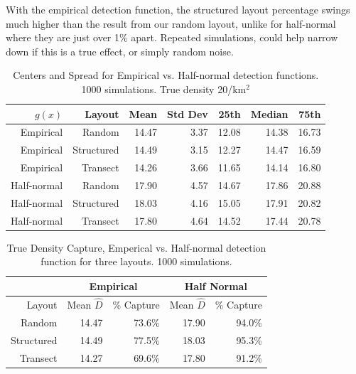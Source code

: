 \documentclass[12pt]{article}
\begin{document}
With the empirical detection function, the structured layout percentage swings much higher than the result from our random layout, unlike for half-normal where they are just over 1\% apart. Repeated simulations, could help narrow down if this is a true effect, or simply random noise.
\begin{table}[h]

	\begin{tabular}{ r r |r r| r r r}
		$g(x)$      & Layout     & Mean  & Std Dev & 25th  & Median & 75th  \\ \hline\hline
		Empirical   & Random     & 14.47 & 3.37    & 12.08 & 14.38  & 16.73 \\
		Empirical   & Structured & 14.49 & 3.15    & 12.27 & 14.47  & 16.59 \\
		Empirical   & Transect   & 14.26 & 3.66    & 11.65 & 14.14  & 16.80 \\ \hline
		Half-normal & Random     & 17.90 & 4.57    & 14.67 & 17.86  & 20.88 \\
		Half-normal & Structured & 18.03 & 4.16    & 15.05 & 17.91  & 20.82 \\
		Half-normal & Transect   & 17.80 & 4.64    & 14.52 & 17.44  & 20.78
	\end{tabular}
	\caption{Centers and Spread for Empirical vs. Half-normal detection functions. 1000 simulations. True density 20/km$^2$}
	\label{table:sim1}
\end{table}
\begin{table}[h]

	\begin{tabular}{ r| r r| r r|}
		           & \multicolumn{2}{|c|}{Empirical} & \multicolumn{2}{|c|}{Half Normal} \\ \hline\hline
		Layout     & Mean $\hat{D}$ & \% Capture     & Mean $\hat{D}$ & \% Capture       \\ \hline\hline
		Random     & 14.47          & 73.6\%         & 17.90          & 94.0\%           \\
		Structured & 14.49          & 77.5\%         & 18.03          & 95.3\%           \\
		Transect   & 14.27          & 69.6\%         & 17.80          & 91.2\%           \\ \hline
	\end{tabular}
	\caption{True Density Capture, Emperical vs. Half-normal detection function for three layouts. 1000 simulations.}
	\label{table:sim1capture}
\end{table}
\end{document}
